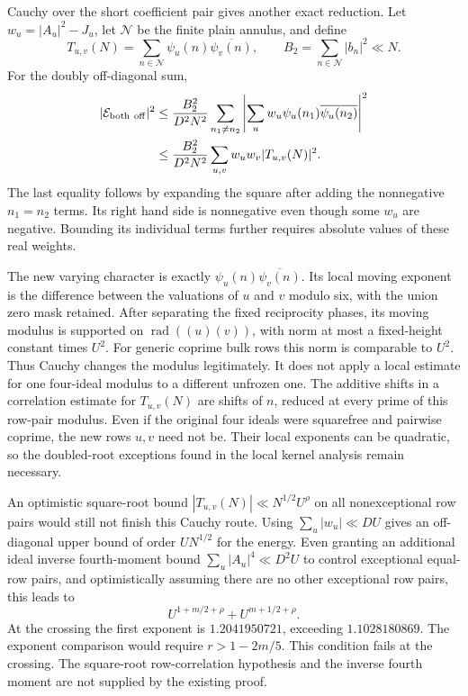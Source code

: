 \documentclass[11pt]{article}
\newcommand{\rad}{\operatorname{rad}}
\begin{document}
Cauchy over the short coefficient pair gives another exact reduction.
Let $w_u=|A_u|^2-J_u$, let $\mathcal N$ be the finite plain annulus,
and define
\[
 T_{u,v}(N)=\sum_{n\in\mathcal N}\psi_u(n)\overline{\psi_v(n)},
 \qquad B_2=\sum_{n\in\mathcal N}|b_n|^2\ll N.
\]
For the doubly off-diagonal sum,
\begin{align}
 |\mathcal E_{\mathrm{both\ off}}|^2
 &\le \frac{B_2^2}{D^2N^2}
   \sum_{n_1\ne n_2}
    \left|\sum_u w_u\psi_u(n_1)\overline{\psi_u(n_2)}\right|^2\notag\\
 &\le \frac{B_2^2}{D^2N^2}
   \sum_{u,v} w_u w_v |T_{u,v}(N)|^2.\label{eq:cauchy-row-pair}
\end{align}
The last equality follows by expanding the square after adding the
nonnegative $n_1=n_2$ terms. Its right hand side is nonnegative even
though some $w_u$ are negative. Bounding its individual terms further
requires absolute values of these real weights.

The new varying character is exactly
$\psi_u(n)\overline{\psi_v(n)}$.
Its local moving exponent is the difference between the valuations
of $u$ and $v$ modulo six, with the union zero mask retained.
After separating the fixed reciprocity phases, its moving modulus is
supported on $\rad((u)(v))$, with norm at most a fixed-height constant
times $U^2$. For generic coprime bulk rows this norm is comparable to
$U^2$. Thus Cauchy changes the modulus legitimately. It does not apply
a local estimate for one four-ideal modulus to a different unfrozen one.
The additive shifts in a correlation estimate for $T_{u,v}(N)$ are
shifts of $n$, reduced at every prime of this row-pair modulus.
Even if the original four ideals were squarefree and pairwise coprime,
the new rows $u,v$ need not be. Their local exponents can be quadratic,
so the doubled-root exceptions found in the local kernel analysis remain
necessary.

An optimistic square-root bound $|T_{u,v}(N)|\ll N^{1/2}U^\rho$
on all nonexceptional row pairs would still not finish this Cauchy route.
Using $\sum_u|w_u|\ll DU$ gives an off-diagonal upper bound
of order $U N^{1/2}$ for the energy. Even granting an additional ideal
inverse fourth-moment bound $\sum_u|A_u|^4\ll D^2U$ to control
exceptional equal-row pairs, and optimistically assuming there are no
other exceptional row pairs, this leads to
\[
 U^{1+m/2+\rho}+U^{m+1/2+\rho}.
\]
At the crossing the first exponent is $1.2041950721$, exceeding
$1.1028180869$. The exponent comparison would require
$r>1-2m/5$. This condition fails at the crossing.
The square-root row-correlation hypothesis and the inverse fourth moment
are not supplied by the existing proof.
\end{document}
